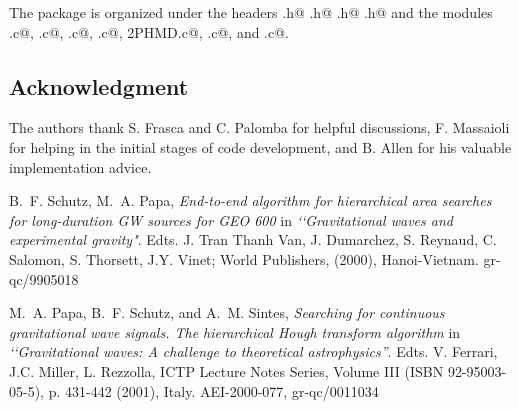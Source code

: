 The package  is organized under the headers
\verb@LUT.h@ \verb@PHMD.h@ \verb@HoughMap.h@  \verb@LALHough.h@ and 
the modules   \verb@PatchGrid.c@,  \verb@Stereographic.c@,  
\verb@ParamPLUT.c@, \verb@ConstructPLUT.c@, 
 \verb@Peak2PHMD.c@,  \verb@HoughMap.c@,  and \verb@DriveHough.c@.

\subsection*{Acknowledgment}
The authors thank S. Frasca and  C. Palomba for helpful discussions,
F. Massaioli for helping in the initial stages of code
development, and B. Allen for his valuable implementation advice.

\newpage
\newpage
\newpage
\newpage


\newpage\begin{thebibliography}{0}

 B.~F. Schutz, M.~A. Papa, 
{\it End-to-end algorithm for hierarchical area searches for 
 long-duration GW sources for GEO 600} in 
  {\it \lq\lq Gravitational waves and experimental gravity"}.
 Edts. J. Tran Thanh Van, J. Dumarchez, S. Reynaud, C. Salomon, S. Thorsett,
J.Y. Vinet; World Publishers,  (2000), Hanoi-Vietnam. gr-qc/9905018
 
 
 M.~A. Papa, B.~F. Schutz, and A.~M. Sintes, 
{\it Searching for continuous gravitational wave signals. The hierarchical Hough
transform algorithm} in 
{\it \lq\lq Gravitational waves: A challenge to theoretical astrophysics''}.
Edts. V. Ferrari, J.C. Miller, L. Rezzolla, 
ICTP Lecture Notes Series, Volume III  (ISBN 92-95003-05-5), p. 431-442 (2001), 
Italy. AEI-2000-077, gr-qc/0011034


\end{thebibliography}
